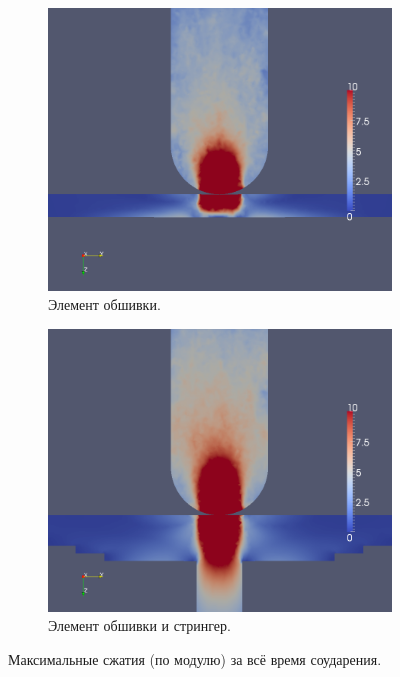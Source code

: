 \begin{figure}[h]
\begin{subfigure}[b]{0.5\textwidth}
\centering
\includegraphics[width=\textwidth]{png/pkm-experiment/wing-only/compression.png}
\caption{Элемент обшивки.}
\end{subfigure}
\begin{subfigure}[b]{0.5\textwidth}
\centering
\includegraphics[width=\textwidth]{png/pkm-experiment/wing-stringer/compression.png}
\caption{Элемент обшивки и стрингер.}
\end{subfigure}
\caption{Максимальные сжатия (по модулю) за всё время соударения.}
\label{pic:pkm_experiment_compression}
\end{figure}

